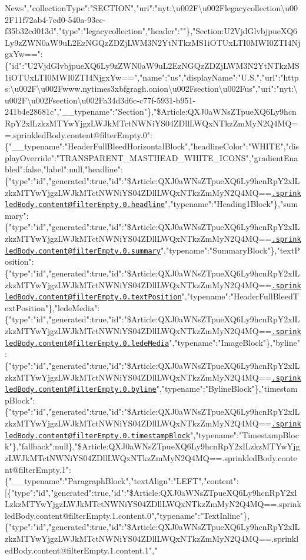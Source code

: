 News","collectionType":"SECTION","uri":"nyt:\textbackslash{}u002F\textbackslash{}u002Flegacycollection\textbackslash{}u002F11f72ab4-7cd0-540a-93cc-f35b32cd013d","type":"legacycollection","header":""\},"Section:U2VjdGlvbjpueXQ6Ly9zZWN0aW9uL2EzNGQzZDZjLWM3N2YtNTkzMS1iOTUxLTI0MWI0ZTI4NjgxYw==":\{"id":"U2VjdGlvbjpueXQ6Ly9zZWN0aW9uL2EzNGQzZDZjLWM3N2YtNTkzMS1iOTUxLTI0MWI0ZTI4NjgxYw==","name":"us","displayName":"U.S.","url":"https:\textbackslash{}u002F\textbackslash{}u002Fwww.nytimes3xbfgragh.onion\textbackslash{}u002Fsection\textbackslash{}u002Fus","uri":"nyt:\textbackslash{}u002F\textbackslash{}u002Fsection\textbackslash{}u002Fa34d3d6c-c77f-5931-b951-241b4e28681c","\_\_typename":"Section"\},"\$Article:QXJ0aWNsZTpueXQ6Ly9hcnRpY2xlLzkzMTYwYjgzLWJkMTctNWNiYS04ZDllLWQxNTkzZmMyN2Q4MQ==.sprinkledBody.content@filterEmpty.0":\{"\_\_typename":"HeaderFullBleedHorizontalBlock","headlineColor":"WHITE","displayOverride":"TRANSPARENT\_MASTHEAD\_WHITE\_ICONS","gradientEnabled":false,"label":null,"headline":\{"type":"id","generated":true,"id":"\$Article:QXJ0aWNsZTpueXQ6Ly9hcnRpY2xlLzkzMTYwYjgzLWJkMTctNWNiYS04ZDllLWQxNTkzZmMyN2Q4MQ==\href{mailto:.sprinkledBody.content@filterEmpty.0.headline}{\nolinkurl{.sprinkledBody.content@filterEmpty.0.headline}}","typename":"Heading1Block"\},"summary":\{"type":"id","generated":true,"id":"\$Article:QXJ0aWNsZTpueXQ6Ly9hcnRpY2xlLzkzMTYwYjgzLWJkMTctNWNiYS04ZDllLWQxNTkzZmMyN2Q4MQ==\href{mailto:.sprinkledBody.content@filterEmpty.0.summary}{\nolinkurl{.sprinkledBody.content@filterEmpty.0.summary}}","typename":"SummaryBlock"\},"textPosition":\{"type":"id","generated":true,"id":"\$Article:QXJ0aWNsZTpueXQ6Ly9hcnRpY2xlLzkzMTYwYjgzLWJkMTctNWNiYS04ZDllLWQxNTkzZmMyN2Q4MQ==\href{mailto:.sprinkledBody.content@filterEmpty.0.textPosition}{\nolinkurl{.sprinkledBody.content@filterEmpty.0.textPosition}}","typename":"HeaderFullBleedTextPosition"\},"ledeMedia":\{"type":"id","generated":true,"id":"\$Article:QXJ0aWNsZTpueXQ6Ly9hcnRpY2xlLzkzMTYwYjgzLWJkMTctNWNiYS04ZDllLWQxNTkzZmMyN2Q4MQ==\href{mailto:.sprinkledBody.content@filterEmpty.0.ledeMedia}{\nolinkurl{.sprinkledBody.content@filterEmpty.0.ledeMedia}}","typename":"ImageBlock"\},"byline":\{"type":"id","generated":true,"id":"\$Article:QXJ0aWNsZTpueXQ6Ly9hcnRpY2xlLzkzMTYwYjgzLWJkMTctNWNiYS04ZDllLWQxNTkzZmMyN2Q4MQ==\href{mailto:.sprinkledBody.content@filterEmpty.0.byline}{\nolinkurl{.sprinkledBody.content@filterEmpty.0.byline}}","typename":"BylineBlock"\},"timestampBlock":\{"type":"id","generated":true,"id":"\$Article:QXJ0aWNsZTpueXQ6Ly9hcnRpY2xlLzkzMTYwYjgzLWJkMTctNWNiYS04ZDllLWQxNTkzZmMyN2Q4MQ==\href{mailto:.sprinkledBody.content@filterEmpty.0.timestampBlock}{\nolinkurl{.sprinkledBody.content@filterEmpty.0.timestampBlock}}","typename":"TimestampBlock"\},"fallback":null\},"\$Article:QXJ0aWNsZTpueXQ6Ly9hcnRpY2xlLzkzMTYwYjgzLWJkMTctNWNiYS04ZDllLWQxNTkzZmMyN2Q4MQ==.sprinkledBody.content@filterEmpty.1":\{"\_\_typename":"ParagraphBlock","textAlign":"LEFT","content":{[}\{"type":"id","generated":true,"id":"\$Article:QXJ0aWNsZTpueXQ6Ly9hcnRpY2xlLzkzMTYwYjgzLWJkMTctNWNiYS04ZDllLWQxNTkzZmMyN2Q4MQ==.sprinkledBody.content@filterEmpty.1.content.0","typename":"TextInline"\},\{"type":"id","generated":true,"id":"\$Article:QXJ0aWNsZTpueXQ6Ly9hcnRpY2xlLzkzMTYwYjgzLWJkMTctNWNiYS04ZDllLWQxNTkzZmMyN2Q4MQ==.sprinkledBody.content@filterEmpty.1.content.1","